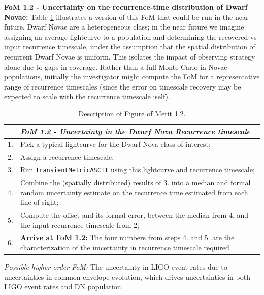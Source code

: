 {\bf FoM 1.2 - Uncertainty on the recurrence-time distribution of
  Dwarf Novae:} Table \ref{table:pseudoFOM_1p2} illustrates a
  version of this FoM that could be run in the near future. Dwarf
  Novae are a heterogeneous class; in the near future we imagine
  assigning an average lightcurve to a population and determining the
  recovered vs input recurrence timescale, under the assumption that
  the spatial distribution of recurrent Dwarf Novae is uniform. This
  isolates the impact of observing strategy alone due to gaps in
  coverage. Rather than a full Monte Carlo in Novae populations,
  initially the investigator might compute the FoM for a
  representative range of recurrence timescales (since the error on
  timescale recovery may be expected to scale with the recurrence
  timescale iself).

\begin{table}[h]
  \small
  \begin{tabular}{c p{12cm}}
    & {\it FoM 1.2 - Uncertainty in the Dwarf Nova Recurrence timescale} \\
    \hline
  1. & Pick a typical lightcurve for the Dwarf Nova class of interest; \\
  2. & Assign a recurrence timescale; \\
  3. & Run {\tt TransientMetricASCII} using this lightcurve and recurrence timescale; \\
  4. & Combine the (spatially distributed) results of 3. into a median and formal random uncertainty estimate on the recurrence time estimated from each line of sight; \\
  5. & Compute the offset and its formal error, between the median from 4. and the input recurrence timescale from 2;\\
  6. & {\bf Arrive at FoM 1.2:} The four numbers from steps 4. and 5. are the characterization of the uncertainty in recurrence timescale required. \\
\hline
    \end{tabular}
 \caption{Description of Figure of Merit 1.2.}
  \label{table:pseudoFOM_1p2}
\end{table}

{\it Possible higher-order FoM:} The uncertainty in LIGO event rates
due to uncertainties in common envelope evolution, which drives
uncertainties in both LIGO event rates and DN population.


